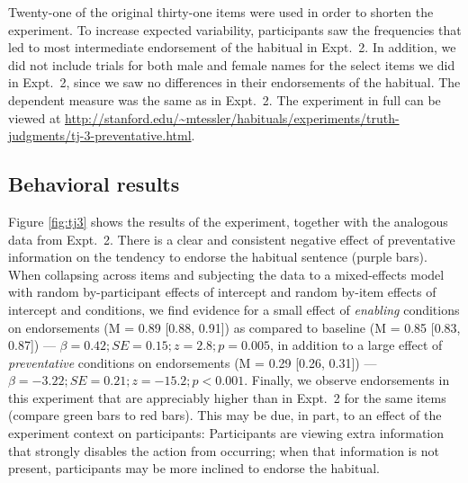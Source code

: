 \documentclass[10pt,letterpaper]{article}
\begin{document}
Twenty-one of the original thirty-one items were used in order to shorten the experiment.
To increase expected variability, participants saw the frequencies that led to most intermediate endorsement of the habitual in Expt.~2. 
In addition, we did not include trials for both male and female names for the select items we did in Expt.~2, since we saw no differences in their endorsements of the habitual.
The dependent measure was the same as in Expt.~2. 
The experiment in full can be viewed at \url{http://stanford.edu/~mtessler/habituals/experiments/truth-judgments/tj-3-preventative.html}.

\subsection{Behavioral results}

Figure \ref{fig:tj3} shows the results of the experiment, together with the analogous data from Expt.~2. 
There is a clear and consistent negative effect of preventative information on the tendency to endorse the habitual sentence (purple bars).
When collapsing across items and subjecting the data to a mixed-effects model with random by-participant effects of intercept and random by-item effects of intercept and conditions, we find evidence for a small effect of \emph{enabling} conditions on endorsements (M =  0.89 [0.88, 0.91]) as compared to baseline (M = 0.85 [0.83, 0.87]) --- $\beta = 0.42; SE = 0.15; z = 2.8; p = 0.005$, in addition to a large effect of \emph{preventative} conditions on endorsements (M = 0.29 [0.26, 0.31]) --- $\beta = -3.22; SE = 0.21; z = -15.2; p < 0.001$. 
Finally, we observe endorsements in this experiment that are appreciably higher than in Expt.~2 for the same items (compare green bars to red bars).
This may be due, in part, to an effect of the experiment context on participants: Participants are viewing extra information that strongly disables the action from occurring; when that information is not present, participants may be more inclined to endorse the habitual.

\end{document}
